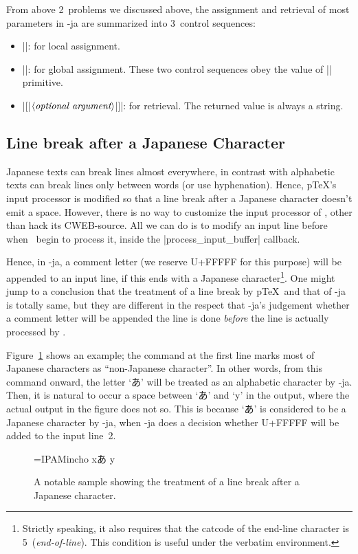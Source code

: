\documentclass{ajt}
\begin{document}
From above 2~problems we discussed above, the assignment and retrieval
of most parameters in \LuaTeX-ja are summarized into 3~control sequences:
\begin{itemize}
\item ||: for local
      assignment.
\item |\ltjglobalsetparameter|: for global assignment. These two control
      sequences obey the value of |\globaldefs| primitive.
\item |[{|$\langle\hbox{\it optional
      argument}\rangle$|}]|: for retrieval. The returned value is always
      a string.
\end{itemize}

\subsection{Line break after a Japanese Character}
\label{ssec-line} 

Japanese texts can break lines almost everywhere, in contrast with
alphabetic texts can break lines only between words (or use
hyphenation). Hence, p\TeX's input processor is modified so that a
line break after a Japanese character doesn't emit a space. However,
there is no way to customize the input processor of \LuaTeX, other than
hack its CWEB-source. All we can do is to modify an input line before
when \LuaTeX\ begin to process it, inside the |process_input_buffer|
callback.

Hence, in \LuaTeX-ja, a comment letter (we reserve U+FFFFF for this
purpose) will be appended to an input line, if this ends with a Japanese
character\footnote{Strictly speaking, it also requires that the catcode
of the end-line character is 5~(\emph{end-of-line}). This condition is
useful under the verbatim environment.}. One might jump to a conclusion
that the treatment of a line break by p\TeX\ and that of \LuaTeX-ja is
totally same, but they are different in the respect that \LuaTeX-ja's
judgement whether a comment letter will be appended the line is done
\emph{before} the line is actually processed by \LuaTeX.

Figure~\ref{fig-linebreak} shows an example; the command at the first
line marks most of Japanese characters as ``non-Japanese character''. In
other words, from this command onward, the letter `あ' will be treated
as an alphabetic character by \LuaTeX-ja. Then, it is natural to occur a
space between `あ' and `y' in the output, where the actual output in the
figure does not so.  This is because `あ' is considered to be a Japanese
character by \LuaTeX-ja, when \LuaTeX-ja does a decision whether U+FFFFF
will be added to the input line~2.
\begin{figure}
\begin{LTXexample}
\font\x=IPAMincho \x
{}xあ
y
\end{LTXexample}
\caption{A notable sample showing the treatment of a line break after a
Japanese character.}\label{fig-linebreak}
\end{figure}
\end{document}
